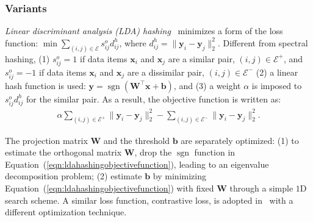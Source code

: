 \documentclass[10pt,journal,compsoc]{IEEEtran}
\begin{document}
\subsubsection{Variants}
\emph{Linear discriminant analysis (LDA) hashing}~\cite{StrechaBBF12}
minimizes a form of the loss function:
$\operatorname{min} \sum_{(i,j) \in \mathcal{E}} s_{ij}^o d_{ij}^h$,
where $d_{ij}^h = \|\mathbf{y}_i - \mathbf{y}_j\|_2^2$.
Different from spectral hashing,
(1) $s_{ij}^o = 1$ if data items $\mathbf{x}_i$ and $\mathbf{x}_j$ are a similar pair,
$(i,j) \in \mathcal{E}^+$,
and $s_{ij}^o = -1$ if data items $\mathbf{x}_i$ and $\mathbf{x}_j$ are a dissimilar pair,
$(i,j) \in \mathcal{E}^-$
(2) a linear hash function is used:
$\mathbf{y} = \operatorname{sgn}(\mathbf{W}^\top\mathbf{x} + \mathbf{b})$,
and (3) a weight $\alpha$ is imposed to
$s_{ij}^o d_{ij}^h$ for the similar pair.
As a result,
the objective function is written as:
\begin{align}
\alpha\sum\nolimits_{(i,j)\in \mathcal{E}^+} \|\mathbf{y}_i - \mathbf{y}_j\|_2^2
- \sum\nolimits_{(i,j)\in \mathcal{E}^-} \|\mathbf{y}_i - \mathbf{y}_j\|_2^2.
\label{eqn:ldahashingobjectivefunction}
\end{align}

The projection matrix $\mathbf{W}$ and the threshold $\mathbf{b}$
are separately optimized:
(1) to estimate the orthogonal matrix $\mathbf{W}$, drop the $\operatorname{sgn}$ function in Equation~(\ref{eqn:ldahashingobjectivefunction}),
leading to an eigenvalue decomposition problem;
(2) estimate $\mathbf{b}$ by minimizing Equation~(\ref{eqn:ldahashingobjectivefunction})
with fixed $\mathbf{W}$
through a simple $1$D search scheme.
A similar loss function,
contrastive loss, is adopted in~\cite{DaiLWJ16}
with a different optimization technique.
\end{document}

